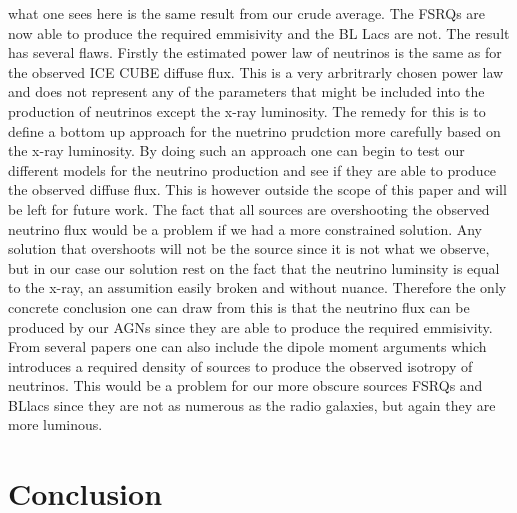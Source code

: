 \documentclass{article}
\begin{document}
what one sees here is the same result from our crude average. The FSRQs are now able to produce the required emmisivity and the BL Lacs are not. The result has several flaws. Firstly the estimated power law of neutrinos is the same as for the observed ICE CUBE diffuse flux. This is a very arbritrarly chosen power law and does not represent any of the parameters that might be included into the production of neutrinos except the x-ray luminosity. 
The remedy for this is to define a bottom up approach for the nuetrino prudction more carefully based on the x-ray luminosity. By doing such an approach one can begin to test our different models for the neutrino production and see if they are able to produce the observed diffuse flux. 
This is however outside the scope of this paper and will be left for future work.
The fact that all sources are overshooting the observed neutrino flux would be a problem if we had a more constrained solution. Any solution that overshoots will not be the source since it is not what we observe, but in our case 
our solution rest on the fact that the neutrino luminsity is equal to the x-ray, an assumition easily broken and without nuance. Therefore the only concrete conclusion one can draw from this is that the neutrino flux can be produced by our AGNs since they are able to produce the required emmisivity.
From several papers one can also include the dipole moment arguments which introduces a required density of sources to produce the observed isotropy of neutrinos. This would be a problem for our more obscure sources FSRQs and BLlacs since they are not as numerous as the radio galaxies, but again they are more luminous.  
\section{Conclusion}




\end{document}
